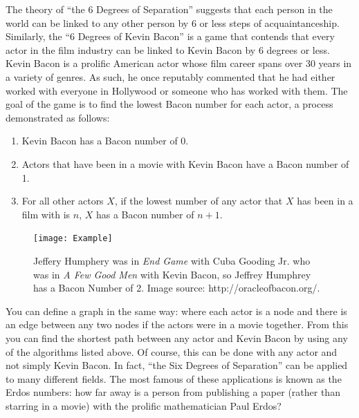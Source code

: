 The theory of ``the 6 Degrees of Separation'' suggests that each person in the world can be linked to any other person by 6 or less steps of acquaintanceship.
Similarly, the ``6 Degrees of Kevin Bacon'' is a game that contends that every actor in the film industry can be linked to Kevin Bacon by 6 degrees or less. Kevin Bacon is a prolific American actor whose film career spans over 30 years in a variety of genres. As such, he once reputably commented that he had either worked with everyone in Hollywood or someone who has worked with them. The goal of the game is to find the lowest Bacon number for each actor, a process demonstrated as follows:
\begin{enumerate}
\item Kevin Bacon has a Bacon number of 0.
\item Actors that have been in a movie with Kevin Bacon have a Bacon number of 1.
\item For all other actors $X$, if the lowest number of any actor that $X$ has been in a film with is $n$, $X$ has a Bacon number of $n+1$.
\end{enumerate}

\begin{figure}[h]
\texttt{[image: Example]}
\caption{Jeffery Humphery was in \emph{End Game} with Cuba Gooding Jr. who was in \emph{A Few Good Men} with Kevin Bacon, so Jeffrey Humphrey has a Bacon Number of 2.  Image source: http://oracleofbacon.org/.}
\end{figure}

You can define a graph in the same way: where each actor is a node and there is an edge between any two nodes if the actors were in a movie together. From this you can find the shortest path between any actor and Kevin Bacon by using any of the algorithms listed above. Of course, this can be done with any actor and not simply Kevin Bacon. In fact, ``the Six Degrees of Separation'' can be applied to many different fields. The most famous of these applications is known as the Erdos numbers: how far away is a person from publishing a paper (rather than starring in a movie) with the prolific mathematician Paul Erdos?

